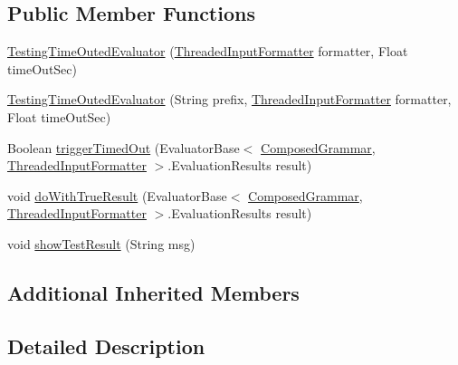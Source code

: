 \subsection*{Public Member Functions}
\begin{DoxyCompactItemize}
\item 
\hyperlink{classit_1_1emarolab_1_1cagg_1_1core_1_1evaluation_1_1TestingTimeOutedEvaluator_a30a574931ca7be55dfbe8b89bc9b7b17}{Testing\-Time\-Outed\-Evaluator} (\hyperlink{classit_1_1emarolab_1_1cagg_1_1core_1_1evaluation_1_1inputFormatting_1_1ThreadedInputFormatter}{Threaded\-Input\-Formatter} formatter, Float time\-Out\-Sec)
\item 
\hyperlink{classit_1_1emarolab_1_1cagg_1_1core_1_1evaluation_1_1TestingTimeOutedEvaluator_adcc11c39e6e0f050ccb36ba94887a51a}{Testing\-Time\-Outed\-Evaluator} (String prefix, \hyperlink{classit_1_1emarolab_1_1cagg_1_1core_1_1evaluation_1_1inputFormatting_1_1ThreadedInputFormatter}{Threaded\-Input\-Formatter} formatter, Float time\-Out\-Sec)
\item 
Boolean \hyperlink{classit_1_1emarolab_1_1cagg_1_1core_1_1evaluation_1_1TestingTimeOutedEvaluator_ad3fae1d1e163beed5d42f21c294aef7a}{trigger\-Timed\-Out} (Evaluator\-Base$<$ \hyperlink{classit_1_1emarolab_1_1cagg_1_1core_1_1evaluation_1_1interfacing_1_1ComposedGrammar}{Composed\-Grammar}, \hyperlink{classit_1_1emarolab_1_1cagg_1_1core_1_1evaluation_1_1inputFormatting_1_1ThreadedInputFormatter}{Threaded\-Input\-Formatter} $>$.Evaluation\-Results result)
\item 
void \hyperlink{classit_1_1emarolab_1_1cagg_1_1core_1_1evaluation_1_1TestingTimeOutedEvaluator_aba73b23c99f7548f87f5290665f875ba}{do\-With\-True\-Result} (Evaluator\-Base$<$ \hyperlink{classit_1_1emarolab_1_1cagg_1_1core_1_1evaluation_1_1interfacing_1_1ComposedGrammar}{Composed\-Grammar}, \hyperlink{classit_1_1emarolab_1_1cagg_1_1core_1_1evaluation_1_1inputFormatting_1_1ThreadedInputFormatter}{Threaded\-Input\-Formatter} $>$.Evaluation\-Results result)
\item 
void \hyperlink{classit_1_1emarolab_1_1cagg_1_1core_1_1evaluation_1_1TestingTimeOutedEvaluator_afae0c6ff3cc47468ea9ba931f39c65f5}{show\-Test\-Result} (String msg)
\end{DoxyCompactItemize}
\subsection*{Additional Inherited Members}


\subsection{Detailed Description}


